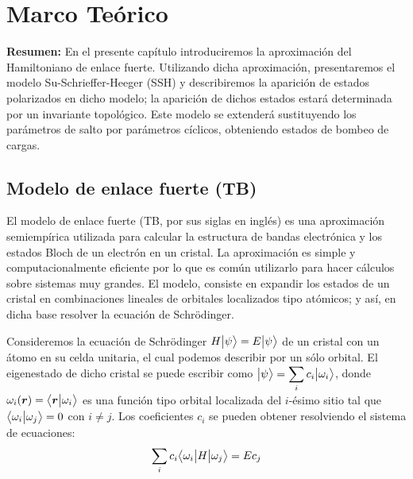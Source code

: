 \chapter{Marco Teórico}

\begin{center}
\begin{minipage}{0.9\textwidth}
{\small
{\bf Resumen:} En el presente capítulo introduciremos la aproximación del Hamiltoniano de enlace fuerte. Utilizando dicha aproximación, presentaremos el modelo Su-Schrieffer-Heeger (SSH) y describiremos la aparición de estados polarizados en dicho modelo; la aparición de dichos estados estará determinada por un invariante topológico. Este modelo se extenderá sustituyendo los parámetros de salto por parámetros cíclicos, obteniendo estados de bombeo de cargas.
}
\end{minipage}
\end{center}

    
    \section{Modelo de enlace fuerte (TB)}
    El modelo de enlace fuerte (TB, por sus siglas en inglés) es una aproximación semiempírica utilizada para calcular la estructura de bandas electrónica y los estados Bloch de un electrón en un cristal. La aproximación es simple y computacionalmente eficiente por lo que es común utilizarlo para hacer cálculos sobre sistemas muy grandes.
    El modelo, consiste en expandir los estados de un cristal en combinaciones lineales de orbitales localizados tipo atómicos; y así, en dicha base resolver la ecuación de Schrödinger.
    
    Consideremos la ecuación de Schrödinger $H \big |{\psi}\big \rangle = E \big |{\psi}\big \rangle$ de un cristal con un átomo en su celda unitaria, el cual podemos describir por un sólo orbital. El eigenestado de dicho cristal se puede escribir como $\big |{\psi}\big \rangle = \displaystyle 
    \sum_{i} c_i \big |{\omega_i}\big \rangle$, donde $\omega_i(\boldsymbol{r})=\big \langle{\boldsymbol{r}}\big | {\omega_i} \big \rangle$ es una función tipo orbital localizada del $i$-ésimo sitio tal que $\big \langle{\omega_i}\big | {\omega_j} \big \rangle = 0$  con $i \neq j$. Los coeficientes $c_i$ se pueden obtener resolviendo el sistema de ecuaciones:
    \begin{equation}
    \label{Coefficent_no_ortogonal}
        \sum_i c_i \big \langle{\omega_i}\big | {H} \big | {\omega_j} \big \rangle = E c_j
    \end{equation}
    
